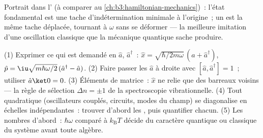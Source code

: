 \begin{omfigure}

{\small Portrait dans l' (à comparer au
\cref{ch:b3:hamiltonian-mechanics})~: l'état fondamental est une tache
d'indétermination minimale à l'origine~; un  est la même
tache déplacée, tournant à $\omega$ sans se déformer --- la meilleure
imitation d'une oscillation classique que la mécanique quantique
sache produire.}
\end{omfigure}

\begin{method}\label{met:b3:harmonic-oscillator:method}
(1) Exprimer ce qui est demandé en $\hat a$, $\hat a^\dagger$~: $\hat x
= \sqrt{\hbar/2m\omega}\,(\hat a + \hat a^\dagger)$, $\hat p =
\iu\sqrt{m\hbar\omega/2}\,(\hat a^\dagger - \hat a)$. (2) Faire passer
les $\hat a$ à droite avec $[\hat a, \hat a^\dagger] = 1$~; utiliser
$\hat a\ket0 = 0$. (3) Éléments de matrice~: $\hat x$ ne relie que des
barreaux voisins --- la règle de sélection $\Delta n = \pm1$ de la
spectroscopie vibrationnelle. (4) Tout  quadratique
(oscillateurs couplés, circuits, modes du champ) se diagonalise en
échelles indépendantes~: trouver d'abord les , puis
quantifier chacun. (5) Les nombres d'abord~: $\hbar\omega$ comparé à
$k_{\text{B}}T$ décide du caractère quantique ou classique du système
avant toute algèbre.
\end{method}

